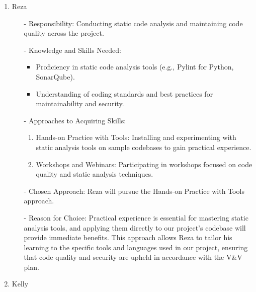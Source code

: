 \documentclass[12pt, titlepage]{article}
\begin{document}
\begin{enumerate}
\begin{enumerate}
\begin{enumerate}
\begin{enumerate}
  \item Reza

  \begin{itemize}
      \item[-] Responsibility: Conducting static code analysis and maintaining code quality across the project.
      \item[-] Knowledge and Skills Needed:
      \begin{itemize}
          \item Proficiency in static code analysis tools (e.g., Pylint for Python, SonarQube).
          \item Understanding of coding standards and best practices for maintainability and security.
      \end{itemize}
      \item[-] Approaches to Acquiring Skills:
      \begin{enumerate}
          \item Hands-on Practice with Tools: Installing and experimenting with static analysis tools on sample codebases to gain practical experience.
          \item Workshops and Webinars: Participating in workshops focused on code quality and static analysis techniques.
      \end{enumerate}
      \item[-] Chosen Approach: Reza will pursue the Hands-on Practice with Tools approach.
      \item[-] Reason for Choice: Practical experience is essential for mastering static analysis tools, and applying them directly to our project's codebase will provide immediate benefits. This approach allows Reza to tailor his learning to the specific tools and languages used in our project, ensuring that code quality and security are upheld in accordance with the V\&V plan.
  \end{itemize}

  \item Kelly


\end{enumerate}
\end{enumerate}
\end{enumerate}
\end{enumerate}
\end{document}
